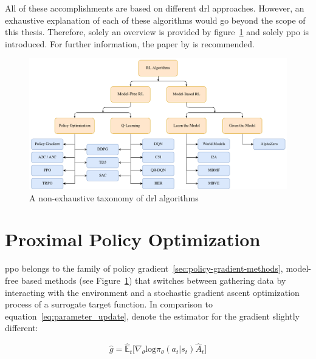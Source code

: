 \documentclass[draft,final]{vutinfth} %
\begin{document}
    All of these accomplishments are based on different \gls{drl} approaches.
    However, an exhaustive explanation of each of these algorithms would go beyond the scope of this thesis.
    Therefore, solely an overview is provided by figure~\ref{fig:drl_taxonomy} and solely \gls{ppo} is introduced.
    For further information, the paper by \citeauthor{francois-lavet_introduction_2018} is recommended.

    \begin{figure}[h]
        \centering
        \includegraphics[width=\textwidth]{figures/drl_taxonomy.png}
        \caption[A non-exhaustive taxonomy of \gls{drl} algorithms]{A non-exhaustive taxonomy of \gls{drl} algorithms\protect\footnotemark}
        \label{fig:drl_taxonomy}
    \end{figure}



    \section{Proximal Policy Optimization}\label{sec:proximal-policy-optimization}
    \gls{ppo} belongs to the family of policy gradient~\eqref{sec:policy-gradient-methods}, model-free based methods (see Figure~\ref{fig:drl_taxonomy}) that switches between gathering data by interacting with the environment and a stochastic gradient ascent optimization process of a surrogate target function.
    In comparison to equation~\ref{eq:parameter_update}, \citeauthor{schulman_proximal_2017} denote the estimator for the gradient slightly different:

    \begin{equation}
        \hat{g}=\hat{\mathbb{E}}_t \bigg [\nabla_\theta \text{log}\pi_\theta(a_t|s_t)\hat{A}_t\bigg]\label{eq:policy_gradient_method_maximization}
    \end{equation}
\end{document}
